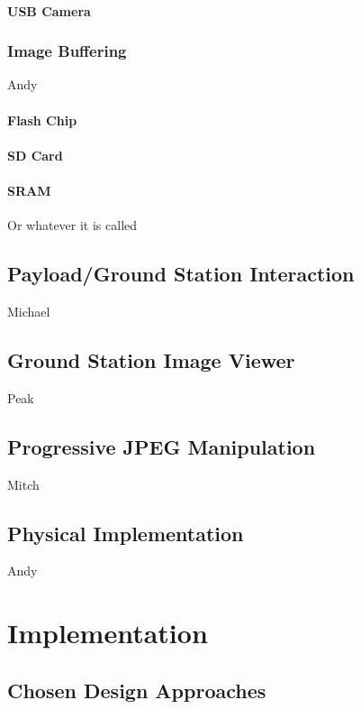 \documentclass[oneside]{ecsgdp}         %
\begin{document}
\subsubsection{USB Camera}


\subsection{Image Buffering}
Andy

\subsubsection{Flash Chip}

\subsubsection{SD Card}

\subsubsection{SRAM}
Or whatever it is called

\section{Payload/Ground Station Interaction}
Michael

\section{Ground Station Image Viewer}
Peak

\section{Progressive JPEG Manipulation}
Mitch

\section{Physical Implementation}
Andy


\chapter{Implementation}


\section{Chosen Design Approaches}
\end{document}
